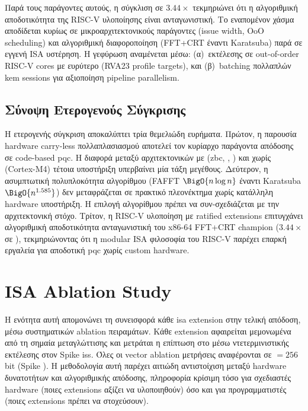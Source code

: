 Παρά τους παράγοντες αυτούς, η σύγκλιση σε $3.44\times$ \instret
τεκμηριώνει ότι η αλγοριθμική αποδοτικότητα της RISC-V υλοποίησης είναι
ανταγωνιστική. Το εναπομένον χάσμα αποδίδεται κυρίως σε
μικροαρχιτεκτονικούς παράγοντες (issue width, OoO scheduling) και αλγοριθμική
διαφοροποίηση (FFT+CRT έναντι Karatsuba) παρά σε εγγενή ISA υστέρηση.
Η γεφύρωση αναμένεται μέσω: (α)~εκτέλεσης σε out-of-order RISC-V cores
με ευρύτερο \VLEN (RVA23 profile targets), και (β)~batching πολλαπλών
\gls{kem} sessions για αξιοποίηση pipeline parallelism.

\subsection{Σύνοψη Ετερογενούς Σύγκρισης}
\label{ssec:cross-arch-summary}

Η ετερογενής σύγκριση αποκαλύπτει τρία θεμελιώδη ευρήματα. Πρώτον, η
παρουσία hardware carry-less πολλαπλασιασμού αποτελεί τον κυρίαρχο παράγοντα
απόδοσης σε code-based \gls{pqc}. Η διαφορά μεταξύ αρχιτεκτονικών με
(\gls{zbc}, , ) και χωρίς (Cortex-M4) τέτοια
υποστήριξη υπερβαίνει μία τάξη μεγέθους. Δεύτερον, η ασυμπτωτική
πολυπλοκότητα αλγορίθμου (FAFFT $\BigO{n \log n}$ έναντι Karatsuba
$\BigO{n^{1.585}}$) δεν μεταφράζεται σε πρακτικό πλεονέκτημα χωρίς
κατάλληλη hardware υποστήριξη. Η επιλογή αλγορίθμου πρέπει να
συν-σχεδιάζεται με την αρχιτεκτονική στόχο. Τρίτον, η RISC-V υλοποίηση
με ratified extensions επιτυγχάνει αλγοριθμική αποδοτικότητα ανταγωνιστική
του x86-64 FFT+CRT champion ($3.44\times$ σε \instret), τεκμηριώνοντας ότι η
modular ISA φιλοσοφία του RISC-V παρέχει επαρκή εργαλεία για αποδοτική
\gls{pqc} χωρίς custom hardware.

\ifTODO
\section{ISA Ablation Study}
\label{sec:isa-ablation}

Η ενότητα αυτή απομονώνει τη συνεισφορά κάθε \gls{isa} extension στην
τελική απόδοση, μέσω συστηματικών ablation πειραμάτων. Κάθε extension
αφαιρείται μεμονωμένα από τη  σημαία μεταγλώττισης και
μετράται η επίπτωση στο \instret μέσω ντετερμινιστικής εκτέλεσης στον
Spike \gls{iss}. Όλες οι vector ablation μετρήσεις αναφέρονται σε \VLEN $= \num{256}$ bit (Spike ). Η μεθοδολογία αυτή παρέχει αιτιώδη αντιστοίχιση μεταξύ
hardware δυνατοτήτων και αλγοριθμικής απόδοσης, πληροφορία κρίσιμη τόσο
για σχεδιαστές hardware (ποιες extensions αξίζει να υλοποιηθούν) όσο και
για προγραμματιστές (ποιες extensions πρέπει να στοχεύσουν).


